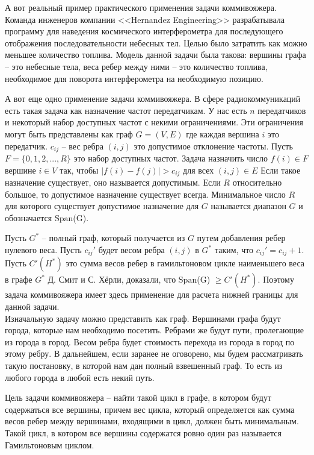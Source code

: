 \documentclass[a4paper, 14pt]{extarticle}
\numberwithin{equation}{section}
\newcommand{\spanOp}{$\mathrm{Span}$}
\begin{document}
А вот реальный пример практического применения задачи коммивояжера. Команда инженеров компании <<Hernandez Engineering>>  разрабатывала программу для наведения космического интерферометра для последующего отображения последовательности небесных тел. Целью было затратить как можно меньшее количество топлива. Модель данной задачи была такова: вершины графа -- это небесные тела, веса ребер между ними -- это количество топлива, необходимое для поворота интерферометра на необходимую позицию.

А вот еще одно применение задачи коммивояжера. В сфере радиокоммуникаций есть такая задача как назначение частот передатчикам. У нас есть $n$ передатчиков и некоторый набор доступных частот с некими ограничениями. Эти ограничения могут быть представлены как граф $G= (V, E)$ где каждая вершина $i$ это передатчик. $c_{ij}$ -- вес ребра $(i,j)$ это допустимое отклонение частоты. Пусть $F = \{ 0,1,2,...,R \}$ это набор доступных частот. Задача назначить число $f(i) \in F$ вершине $i \in V$ так, чтобы $\bigr\lvert f(i)-f(j)\bigr\rvert > c_{ij}$ для всех $(i,j) \in E$ Если такое назначение существует, оно называется допустимым. Если $R$ относительно большое, то допустимое назначение существует всегда. Минимальное число $R$ для которого существует допустимое назначение для $G$ называется диапазон $G$ и обозначается  \spanOp(G).

Пусть $G^*$ -- полный граф, который получается из $G$ путем добавления ребер нулевого веса. Пусть $c_{ij}'$ будет весом ребра $(i,j)$ в $G^*$ таким, что $c_{ij}' = c_{ij}+1$. Пусть $C'(H^*)$ это сумма весов ребер в гамильтоновом цикле наименьшего веса в графе $G^*$ Д. Смит и С. Хёрли, доказали, что \spanOp(G) $\geqslant C'(H^*)$. Поэтому задача коммивояжера имеет здесь применение для расчета нижней границы для данной задачи. \\


Изначальную задачу можно представить как граф. Вершинами графа будут города, которые нам необходимо посетить. Ребрами же будут пути, пролегающие из города в город. Весом ребра будет стоимость перехода из города в город по этому ребру. В дальнейшем, если заранее не оговорено, мы будем рассматривать такую постановку, в которой нам дан полный взвешенный граф. То есть из любого города в любой есть некий путь.

Цель задачи коммивояжера -- найти такой цикл в графе, в котором будут содержаться все вершины, причем вес цикла, который определяется как сумма весов ребер между вершинами, входящими в цикл, должен быть минимальным. Такой цикл, в котором все вершины содержатся ровно один раз называется Гамильтоновым циклом.
\end{document}
